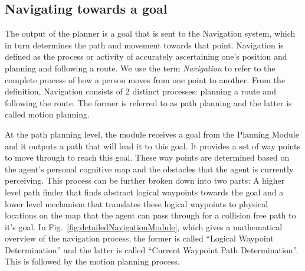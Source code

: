 

\subsection{Navigating towards a goal}
\label{IBEVAC:NavigationModule}

The output of the planner is a goal that is sent to the Navigation system, which in turn determines the path and movement towards that point. Navigation is defined as the process or activity of accurately ascertaining one's position and planning and following a route. We use the term \emph{Navigation} to refer to the complete process of how a person moves from one point to another. From the definition, Navigation consists of 2 distinct processes: planning a route and following the route. The former is referred to as path planning and the latter is called motion planning.



At the path planning level, the module receives a goal from the Planning Module and it outputs a path that will lead it to this goal. It provides a set of way points to move through to reach this goal. These way points are determined based on the agent's personal cognitive map and the obstacles that the agent is currently perceiving. This process can be further broken down into two parts: A higher level path finder that finds abstract logical waypoints towards the goal and a lower level mechanism that translates these logical waypoints to physical locations on the map that the agent can pass through for a collision free path to it's goal. In Fig.~\ref{fig:detailedNavigationModule}, which gives a mathematical overview of the navigation process, the former is called ``Logical Waypoint Determination'' and the latter is called ``Current Waypoint Path Determination''. This is followed by the motion planning process.

